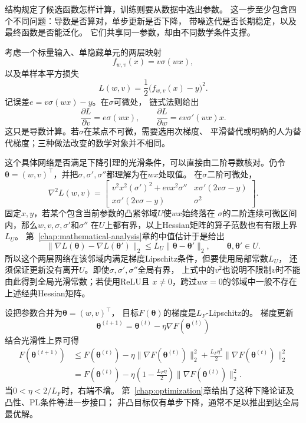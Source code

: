 结构规定了候选函数怎样计算，训练则要从数据中选出参数。
这一步至少包含四个不同问题：导数是否算对，单步更新是否下降，
带噪迭代是否长期稳定，以及最终函数是否能泛化。
它们共享同一参数，却由不同数学条件支撑。

考虑一个标量输入、单隐藏单元的两层映射
\[
  f_{w,v}(x)=v\sigma(wx),
\]
以及单样本平方损失
\[
  L(w,v)
  =
  \frac{1}{2}\bigl(f_{w,v}(x)-y\bigr)^2.
\]
记误差$e=v\sigma(wx)-y$。在$\sigma$可微处，
链式法则给出
\begin{equation}
  \frac{\partial L}{\partial v}
  =
  e\sigma(wx),
  \qquad
  \frac{\partial L}{\partial w}
  =
  ev\sigma'(wx)x.
  \label{eq:future-two-layer-gradient}
\end{equation}
这只是导数计算。若$\sigma$在某点不可微，需要选用次梯度、
平滑替代或明确的人为替代梯度；三种做法改变的数学对象并不相同。

这个具体网络是否满足下降引理的光滑条件，可以直接由二阶导数核对。仍令
\(\bm\theta=(w,v)^{\top}\)，并把\(\sigma,\sigma',\sigma''\)都理解为在\(wx\)处取值。
在\(\sigma\)二阶可微处，
\[
  \nabla^2 L(w,v)
  =
  \begin{bmatrix}
    v^2x^2(\sigma')^2+evx^2\sigma''
    &
    x\sigma'(2v\sigma-y)
    \\
    x\sigma'(2v\sigma-y)
    &
    \sigma^2
  \end{bmatrix}.
\]
固定\(x,y\)，若某个包含当前参数的凸紧邻域\(U\)使\(wx\)始终落在
\(\sigma\)的二阶连续可微区间内，那么\(w,v,\sigma,\sigma'\)和\(\sigma''\)
在\(U\)上都有界，以上Hessian矩阵的算子范数也有有限上界\(L_U\)。
第~\ref{chap:mathematical-analysis}章的中值估计于是给出
\[
  \lVert\nabla L(\bm\theta)-\nabla L(\bm\theta')\rVert_2
  \leq
  L_U\lVert\bm\theta-\bm\theta'\rVert_2,
  \qquad
  \bm\theta,\bm\theta'\in U.
\]
所以这个两层网络在该邻域内满足梯度Lipschitz条件，但要使用局部常数\(L_U\)，
还须保证更新没有离开\(U\)。即使\(\sigma,\sigma',\sigma''\)全局有界，
上式中的\(v^2\)也说明不限制\(v\)时不能由此得到全局光滑常数；若使用ReLU且
\(x\neq0\)，跨过\(wx=0\)的邻域中一般不存在上述经典Hessian矩阵。

设把参数合并为$\bm\theta=(w,v)^{\top}$，
目标$F(\bm\theta)$的梯度是$L_F$-Lipschitz的。
梯度更新
\[
  \bm{\theta}^{(t+1)}
  =
  \bm{\theta}^{(t)}
  -
  \eta\nabla F(\bm{\theta}^{(t)})
\]
结合光滑性上界可得
\begin{align}
  F(\bm{\theta}^{(t+1)})
  &\leq
  F(\bm{\theta}^{(t)})
  -
  \eta\lVert\nabla F(\bm{\theta}^{(t)})\rVert_2^2
  +
  \frac{L_F\eta^2}{2}
  \lVert\nabla F(\bm{\theta}^{(t)})\rVert_2^2
  \nonumber\\
  &=
  F(\bm{\theta}^{(t)})
  -
  \eta
  \left(1-\frac{L_F\eta}{2}\right)
  \lVert\nabla F(\bm{\theta}^{(t)})\rVert_2^2.
  \label{eq:future-gradient-descent-one-step}
\end{align}
当$0<\eta<2/L_F$时，右端不增。
第~\ref{chap:optimization}章给出了这种下降论证及凸性、PL条件等进一步接口；
非凸目标仅有单步下降，通常不足以推出到达全局最优解。

